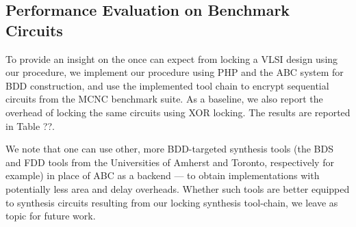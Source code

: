 



\subsection{Performance Evaluation on Benchmark Circuits}
To provide an insight on the once can expect from locking a VLSI design using our procedure, we implement our procedure using PHP and the ABC system \cite{} for BDD construction, and use the implemented tool chain to encrypt sequential circuits from the MCNC benchmark suite. As a baseline, we also report the overhead of locking the same circuits using XOR locking. The results are reported in Table ??.

We note that one can use other, more BDD-targeted synthesis tools (the BDS and FDD tools from the Universities of Amherst and Toronto, respectively for example) in place of ABC as a backend --- to obtain implementations with potentially less area and delay overheads. Whether such tools are better equipped to synthesis circuits resulting from our locking synthesis tool-chain, we leave as topic for future work.









